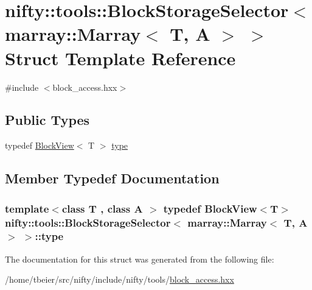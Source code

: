 \hypertarget{structnifty_1_1tools_1_1BlockStorageSelector_3_01marray_1_1Marray_3_01T_00_01A_01_4_01_4}{}\section{nifty\+:\+:tools\+:\+:Block\+Storage\+Selector$<$ marray\+:\+:Marray$<$ T, A $>$ $>$ Struct Template Reference}
\label{structnifty_1_1tools_1_1BlockStorageSelector_3_01marray_1_1Marray_3_01T_00_01A_01_4_01_4}


{\ttfamily \#include $<$block\+\_\+access.\+hxx$>$}

\subsection*{Public Types}
\begin{DoxyCompactItemize}
\item 
typedef \hyperlink{classnifty_1_1tools_1_1BlockView}{Block\+View}$<$ T $>$ \hyperlink{structnifty_1_1tools_1_1BlockStorageSelector_3_01marray_1_1Marray_3_01T_00_01A_01_4_01_4_a7f01429fe6373c157f12ee7c57b6f349}{type}
\end{DoxyCompactItemize}


\subsection{Member Typedef Documentation}
\hypertarget{structnifty_1_1tools_1_1BlockStorageSelector_3_01marray_1_1Marray_3_01T_00_01A_01_4_01_4_a7f01429fe6373c157f12ee7c57b6f349}{}
\subsubsection[{type}]{\setlength{\rightskip}{0pt plus 5cm}template$<$class T , class A $>$ typedef {\bf Block\+View}$<$T$>$ {\bf nifty\+::tools\+::\+Block\+Storage\+Selector}$<$ marray\+::\+Marray$<$ T, A $>$ $>$\+::{\bf type}}\label{structnifty_1_1tools_1_1BlockStorageSelector_3_01marray_1_1Marray_3_01T_00_01A_01_4_01_4_a7f01429fe6373c157f12ee7c57b6f349}


The documentation for this struct was generated from the following file\+:\begin{DoxyCompactItemize}
\item 
/home/tbeier/src/nifty/include/nifty/tools/\hyperlink{block__access_8hxx}{block\+\_\+access.\+hxx}\end{DoxyCompactItemize}

